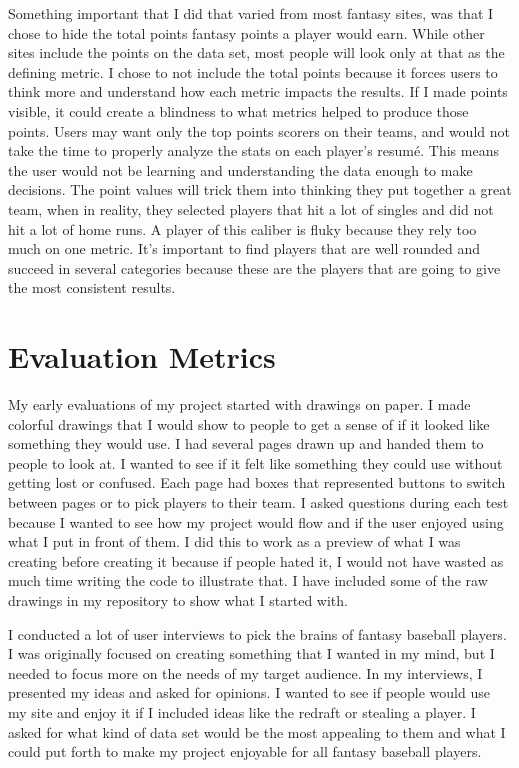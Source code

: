 \documentclass[10pt,twocolumn]{article}
\begin{document}
	Something important that I did that varied from most fantasy sites, was that I chose to hide the total points fantasy points a player would earn. While other sites include the points on the data set, most people will look only at that as the defining metric. I chose to not include the total points because it forces users to think more and understand how each metric impacts the results. If I made points visible, it could create a blindness to what metrics helped to produce those points. Users may want only the top points scorers on their teams, and would not take the time to properly analyze the stats on each player's resumé. This means the user would not be learning and understanding the data enough to make decisions. The point values will trick them into thinking they put together a great team, when in reality, they selected players that hit a lot of singles and did not hit a lot of home runs. A player of this caliber is fluky because they rely too much on one metric. It's important to find players that are well rounded and succeed in several categories because these are the players that are going to give the most consistent results. 
					
\section{Evaluation Metrics}
	My early evaluations of my project started with drawings on paper. I made colorful drawings that I would show to people to get a sense of if it looked like something they would use. I had several pages drawn up and handed them to people to look at. I wanted to see if it felt like something they could use without getting lost or confused. Each page had boxes that represented buttons to switch between pages or to pick players to their team. I asked questions during each test because I wanted to see how my project would flow and if the user enjoyed using what I put in front of them. I did this to work as a preview of what I was creating before creating it because if people hated it, I would not have wasted as much time writing the code to illustrate that. I have included some of the raw drawings in my repository to show what I started with.
	
	I conducted a lot of user interviews to pick the brains of fantasy baseball players. I was originally focused on creating something that I wanted in my mind, but I needed to focus more on the needs of my target audience. In my interviews, I presented my ideas and asked for opinions. I wanted to see if people would use my site and enjoy it if I included ideas like the redraft or stealing a player. I asked for what kind of data set would be the most appealing to them and what I could put forth to make my project enjoyable for all fantasy baseball players. 
	
\end{document}
